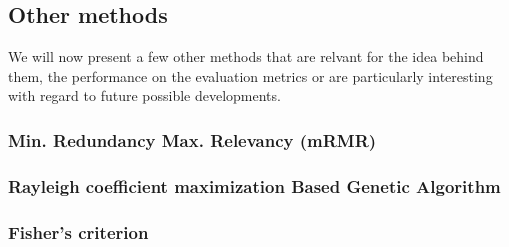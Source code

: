 \documentclass{Configuration_Files/PoliMi3i_thesis}
\begin{document}
\subsection{Other methods}

We will now present a few other methods that are relvant for the idea behind them, the performance on the evaluation metrics or are particularly interesting with regard to future possible developments.

\subsubsection{Min. Redundancy Max. Relevancy (mRMR)}

\subsubsection{Rayleigh coefficient maximization Based Genetic Algorithm}

\subsubsection{Fisher's criterion}



 

\end{document}
